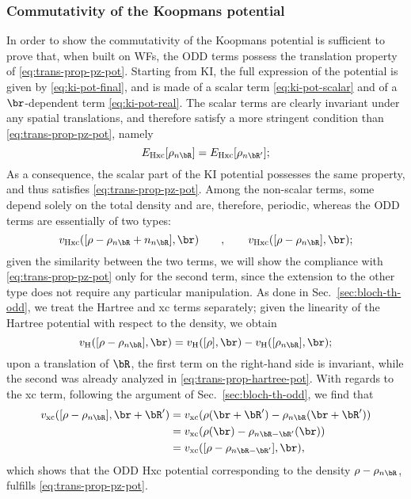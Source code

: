 \subsubsection*{Commutativity of the Koopmans potential}
In order to show the commutativity of the Koopmans potential is sufficient to prove that, when built on WFs, the ODD terms possess the translation property of \cref{eq:trans-prop-pz-pot}. Starting from KI, the full expression of the potential is given by \cref{eq:ki-pot-final}, and is made of a scalar term \eqref{eq:ki-pot-scalar} and of a $\br$-dependent term \eqref{eq:ki-pot-real}. The scalar terms are clearly invariant under any spatial translations, and therefore satisfy a more stringent condition than \cref{eq:trans-prop-pz-pot}, namely
%
\begin{equation}
    E_{\rm Hxc}[\rho_{n\bR}] = E_{\rm Hxc}[\rho_{n\bR'}] ;
\end{equation}
%
As a consequence, the scalar part of the KI potential possesses the same property, and thus satisfies \cref{eq:trans-prop-pz-pot}. Among the non-scalar terms, some depend solely on the total density and are, therefore, periodic, whereas the ODD terms are essentially of two types:
%
\begin{equation}
    v_{\rm Hxc}([\rho-\rho_{n\bR}+n_{n\bR}],\br)
    \qquad , \qquad
    v_{\rm Hxc}([\rho-\rho_{n\bR}],\br) ;
\end{equation}
%
given the similarity between the two terms, we will show the compliance with \cref{eq:trans-prop-pz-pot} only for the second term, since the extension to the other type does not require any particular manipulation. As done in Sec.~\ref{sec:bloch-th-odd}, we treat the Hartree and xc terms separately; given the linearity of the Hartree potential with respect to the density, we obtain
%
\begin{equation}
    v_{\rm H}([\rho-\rho_{n\bR}],\br) = v_{\rm H}([\rho],\br) - v_{\rm H}([\rho_{n\bR}],\br) ;
\end{equation}
%
upon a translation of $\bR$, the first term on the right-hand side is invariant, while the second was already analyzed in \cref{eq:trans-prop-hartree-pot}. With regards to the xc term, following the argument of Sec.~\ref{sec:bloch-th-odd}, we find that
%
\begin{equation}
    \begin{split}
        v_{\rm xc}([\rho-\rho_{n\bR}],\br+\bR') &= v_{\rm xc} (\rho(\br+\bR') - \rho_{n\bR}(\br+\bR')) \\
        &= v_{\rm xc}(\rho(\br) - \rho_{n\bR-\bR'}(\br)) \\
        &= v_{\rm xc}([\rho-\rho_{n\bR-\bR'}],\br) ,
    \end{split}
\end{equation}
%
which shows that the ODD Hxc potential corresponding to the density $\rho-\rho_{n\bR}$, fulfills \cref{eq:trans-prop-pz-pot}.

